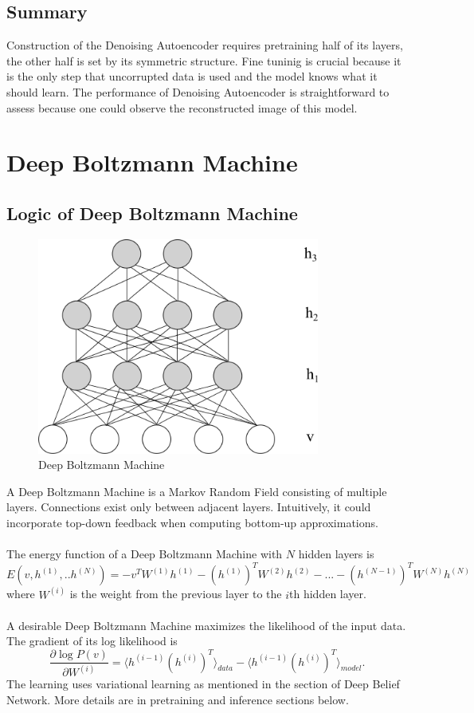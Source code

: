 \documentclass[12pt]{article}
\begin{document}
\subsection{Summary}
Construction of the Denoising Autoencoder requires pretraining half of its layers, the other half is set by its symmetric structure. Fine tuninig is crucial because it is the only step that uncorrupted data is used and the model knows what it should learn. The performance of Denoising Autoencoder is straightforward to assess because one could observe the reconstructed image of this model.  
\clearpage
\section{Deep Boltzmann Machine}
\subsection{Logic of Deep Boltzmann Machine}
\begin{figure}[h]
\centering
\includegraphics[height=2.8in]{DBM.png}
\caption{Deep Boltzmann Machine} \label{fig:side:a}
\end{figure}
A Deep Boltzmann Machine is a Markov Random Field consisting of multiple layers. Connections exist only between adjacent layers. Intuitively, it could incorporate top-down feedback when computing bottom-up approximations.\\
\\
The energy function of a Deep Boltzmann Machine with $N$ hidden layers is\begin{equation}
E(v, h^{(1)},..h^{(N)})=-v^{T}W^{(1)}h^{(1)} -(h^{(1)})^TW^{(2)}h^{(2)}-...- (h^{(N-1)})^TW^{(N)}h^{(N)}
\end{equation}
where $W^{(i)}$ is the weight from the previous layer to the $i$th hidden layer.\\
\\
A desirable Deep Boltzmann Machine maximizes the likelihood of the input data. The gradient of its log likelihood is \begin{equation}
\frac{\partial \log P(v)}{\partial W^{(i)}} = \langle h^{(i-1)}(h^{(i)})^T\rangle_{data} - \langle h^{(i-1)}(h^{(i)})^T\rangle_{model}.
\end{equation}
The learning uses variational learning as mentioned in the section of Deep Belief Network. More details are in pretraining and inference sections below.
\end{document}
